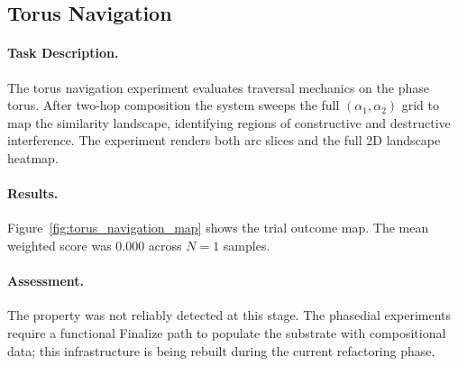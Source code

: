 \subsection{Torus Navigation}
\label{sec:torus_navigation}

\paragraph{Task Description.}
The torus navigation experiment evaluates traversal mechanics on the phase torus.  After two-hop
composition the system sweeps the full $(\alpha_1, \alpha_2)$ grid
to map the similarity landscape, identifying regions of constructive
and destructive interference.  The experiment renders both arc slices
and the full 2D landscape heatmap.

\paragraph{Results.}
Figure~\ref{fig:torus_navigation_map} shows the trial outcome map.
The mean weighted score was 0.000 across $N = 1$ samples.

\paragraph{Assessment.}
The property was not reliably detected at this stage.  The phasedial
experiments require a functional Finalize path to populate the substrate
with compositional data; this infrastructure is being rebuilt during
the current refactoring phase.
